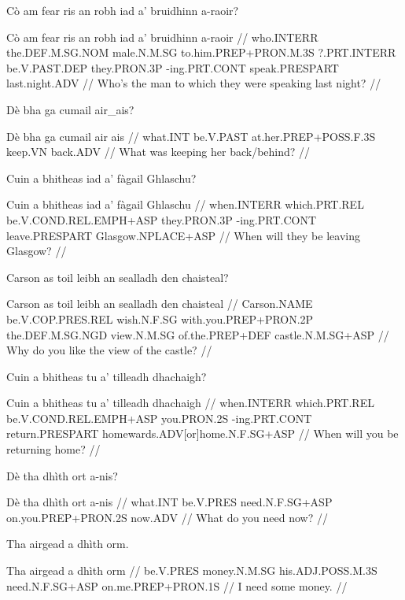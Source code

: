 \documentclass[a4paper,10pt]{article}
\begin{document}
\ex
\begingl
\glpre Cò am fear ris an robh iad a' bruidhinn a-raoir? 

\vspace{4mm}
\gla Cò am fear ris an robh iad a' bruidhinn a-raoir  //
\glb who.INTERR the.DEF.M.SG.NOM male.N.M.SG to.him.PREP+PRON.M.3S ?.PRT.INTERR be.V.PAST.DEP they.PRON.3P -ing.PRT.CONT speak.PRESPART last.night.ADV  //
\glft Who's the man to which they were speaking last night? //
\endgl
\xe

\ex
\begingl
\glpre Dè bha ga cumail air\_ais? 

\vspace{4mm}
\gla Dè bha ga cumail {air ais}  //
\glb what.INT be.V.PAST at.her.PREP+POSS.F.3S keep.VN back.ADV  //
\glft What was keeping her back/behind? //
\endgl
\xe

\ex
\begingl
\glpre Cuin a bhitheas iad a' fàgail Ghlaschu? 

\vspace{4mm}
\gla Cuin a bhitheas iad a' fàgail Ghlaschu  //
\glb when.INTERR which.PRT.REL be.V.COND.REL.EMPH+ASP they.PRON.3P -ing.PRT.CONT leave.PRESPART Glasgow.NPLACE+ASP  //
\glft When will they be leaving Glasgow? //
\endgl
\xe

\ex
\begingl
\glpre Carson as toil leibh an sealladh den chaisteal? 

\vspace{4mm}
\gla Carson as toil leibh an sealladh den chaisteal  //
\glb Carson.NAME be.V.COP.PRES.REL wish.N.F.SG with.you.PREP+PRON.2P the.DEF.M.SG.NGD view.N.M.SG of.the.PREP+DEF castle.N.M.SG+ASP  //
\glft Why do you like the view of the castle? //
\endgl
\xe

\ex
\begingl
\glpre Cuin a bhitheas tu a' tilleadh dhachaigh? 

\vspace{4mm}
\gla Cuin a bhitheas tu a' tilleadh dhachaigh  //
\glb when.INTERR which.PRT.REL be.V.COND.REL.EMPH+ASP you.PRON.2S -ing.PRT.CONT return.PRESPART homewards.ADV[or]home.N.F.SG+ASP  //
\glft When will you be returning home? //
\endgl
\xe

\ex
\begingl
\glpre Dè tha dhìth ort a-nis? 

\vspace{4mm}
\gla Dè tha dhìth ort a-nis  //
\glb what.INT be.V.PRES need.N.F.SG+ASP on.you.PREP+PRON.2S now.ADV  //
\glft What do you need now? //
\endgl
\xe

\ex
\begingl
\glpre Tha airgead a dhìth orm. 

\vspace{4mm}
\gla Tha airgead a dhìth orm  //
\glb be.V.PRES money.N.M.SG his.ADJ.POSS.M.3S need.N.F.SG+ASP on.me.PREP+PRON.1S  //
\glft I need some money. //
\endgl
\xe
\end{document}
